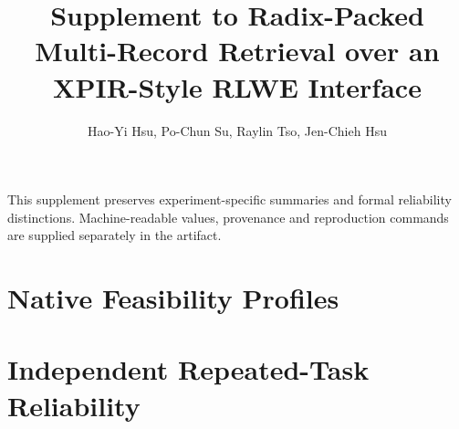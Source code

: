 \documentclass[11pt]{article}
\title{Supplement to Radix-Packed Multi-Record Retrieval over an XPIR-Style RLWE Interface}
\author{Hao-Yi Hsu, Po-Chun Su, Raylin Tso, Jen-Chieh Hsu}
\date{}
\begin{document}
\maketitle
\let\savedtable\table
\renewcommand{\table}[1][]{\savedtable[H]}
This supplement preserves experiment-specific summaries and formal
reliability distinctions. Machine-readable values, provenance and
reproduction commands are supplied separately in the artifact.
\section{Native Feasibility Profiles}

\section{Independent Repeated-Task Reliability}

\clearpage

\end{document}
